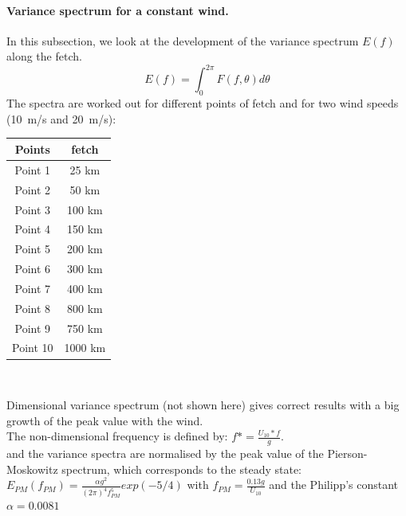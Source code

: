 \paragraph{Variance spectrum for a constant wind.}
In this subsection, we look at the development of the variance spectrum $E(f)$ along the fetch.
\[ E(f) = \int_{0}^{2\pi} F(f,\theta )d\theta
\]
The spectra are worked out for different points of fetch and for two wind speeds (10~m/s and 20~m/s):\\
\begin{center}
\begin{tabular}{c|c}
Points & fetch\\
\hline
Point 1 & 25 km \\
Point 2 & 50 km \\
Point 3 & 100 km \\
Point 4 & 150 km \\
Point 5 & 200 km\\
Point 6 & 300 km \\
Point 7 & 400 km \\
Point 8 & 800 km\\
Point 9 & 750 km\\
Point 10 & 1000 km\\
\end{tabular}\\
\end{center}
Dimensional variance spectrum (not shown here) gives correct results with a big growth of the peak value with the wind.\\
The non-dimensional frequency is defined by: $f* = \frac{U_{10}*f}{g}$.\\
and the variance spectra are normalised by the peak value of the Pierson-Moskowitz spectrum, which corresponds to the steady state:\\
$E_{PM}(f_{PM}) = \frac{\alpha g^2}{(2\pi)^4 f_{PM}^5} exp(-5/4)$ with $f_{PM}=\frac{0.13 g}{U_{10}}$ and the Philipp's constant $\alpha = 0.0081$\\
